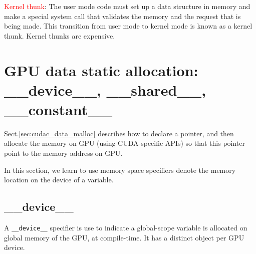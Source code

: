 \label{sec:kernel-thunk}
\textcolor{red}{Kernel thunk}: The user mode code must set up a data structure
in memory and make a special system call that validates the memory and the
request that is being made. This transition from user mode to kernel mode is
known as a kernel thunk. Kernel thunks are expensive.



\section{GPU data static allocation: \_\_device\_\_, \_\_shared\_\_, \_\_constant\_\_}

Sect.\ref{sec:cudac_data_malloc} describes how to declare a pointer, and then
allocate the memory on GPU (using CUDA-specific APIs) so that this pointer point
to the memory address on GPU.

In this section, we learn to use 
memory space specifiers denote the memory location on the device of a variable.

\subsection{\_\_device\_\_}

A \verb!__device__! specifier is use to indicate a global-scope variable is
allocated on global memory of the GPU, at compile-time. It has a distinct object
per GPU device.



